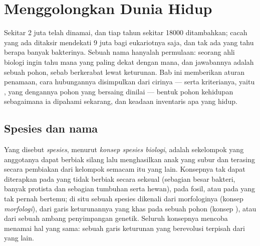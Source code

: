 \chapter{Menggolongkan Dunia Hidup}\label{ch:b1:classifying-biodiversity}

Sekitar \num{2} juta  telah dinamai, dan tiap tahun sekitar
\num{18000} ditambahkan; cacah yang ada ditaksir mendekati \num{9} juta
bagi eukariotnya saja, dan tak ada yang tahu berapa banyak bakterinya.
Sebuah nama hanyalah permulaan: seorang ahli biologi ingin tahu
 mana yang paling dekat dengan mana, dan jawabannya adalah
sebuah pohon, sebab  berkerabat lewat keturunan. Bab ini
memberikan aturan penamaan, cara hubungannya disimpulkan dari
cirinya --- serta kriterianya, yaitu , yang dengannya pohon
yang bersaing dinilai --- bentuk pohon kehidupan sebagaimana ia
dipahami sekarang, dan keadaan inventaris apa yang hidup.

\section{Spesies dan nama}

\begin{definition}[Spesies]\label{def:b1:classifying-biodiversity:species}
Yang disebut \emph{spesies}, menurut \emph{konsep spesies biologi},
adalah sekelompok  yang anggotanya dapat berbiak silang lalu
menghasilkan anak yang subur dan terasing secara pembiakan dari
kelompok semacam itu yang lain. Konsepnya tak dapat diterapkan pada
 yang tidak berbiak secara seksual (sebagian besar bakteri,
banyak protista dan sebagian tumbuhan serta hewan), pada fosil, atau
pada  yang tak pernah bertemu; di situ sebuah spesies dikenali
dari morfologinya (konsep \emph{morfologi}), dari garis keturunannya
yang khas pada sebuah pohon (konsep \emph{}), atau dari sebuah
ambang penyimpangan genetik. Seluruh konsepnya mencoba menamai hal
yang sama: sebuah garis keturunan yang berevolusi terpisah dari yang
lain.
\end{definition}

